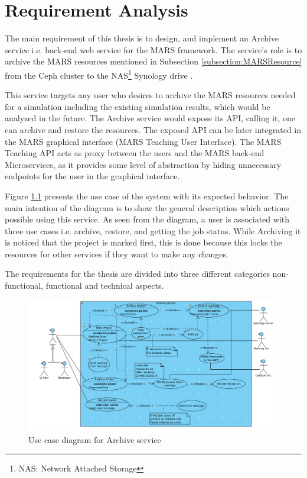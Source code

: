\newpage
\chapter{Requirement Analysis}
 The main requirement of this thesis is to design, and implement an Archive service i.e. back-end web service for the MARS framework. The service's role is to
 archive the MARS resources mentioned in Subsection \ref{subsection:MARSResource} from the Ceph cluster \cite{Ceph} to the 
 NAS\footnote{NAS: Network Attached Storage} Synology drive \cite{Synology}.

 This service targets any user who desires to archive the MARS resources needed for a simulation including the existing simulation results, which would
 be analyzed in the future. The Archive service would expose its API, calling it, one can archive and restore the resources. The exposed
 API can be later integrated in the MARS graphical interface (MARS Teaching User Interface). The MARS Teaching API acts as proxy between the users 
 and the MARS back-end Microservices, as it provides some level of abstraction by hiding unnecessary endpoints for the user in the graphical interface.

 Figure \ref{fig:archiveUseCase} presents the use case of the system with its expected behavior. The main intention of the diagram is to show the
 general description which actions possible using this service. As seen from the diagram, a user is associated with three use cases i.e. archive, restore,
 and getting the job status. 
 While Archiving it is noticed that the project is marked first, this is done because this locks the resources for other services if they want to make any changes.
 
 The requirements for the thesis are divided into three different categories non-functional, 
 functional and technical aspects. 
 \begin{figure}[H]
    \centering \includegraphics[scale=0.6, angle=90, origin=c]{grafiken/archiveUseCase.png}
    \caption{Use case diagram for Archive service}
    \label{fig:archiveUseCase}
\end{figure}
 